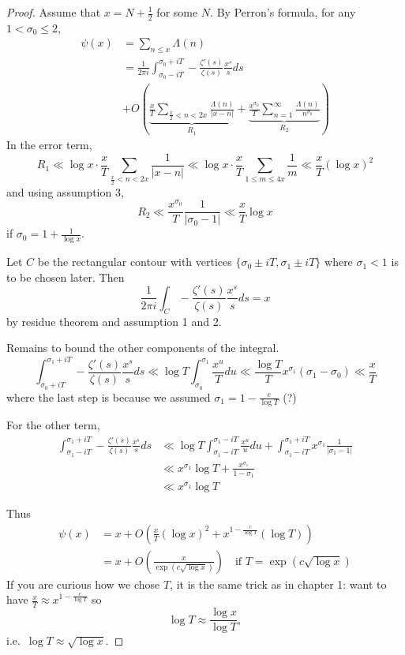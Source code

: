 \documentclass[a4paper]{article}
\theoremstyle{definition}
\begin{document}
\begin{proof}
  Assume that \(x = N + \frac{1}{2}\) for some \(N\). By Perron's formula, for any \(1 < \sigma_0 \leq 2\),
  \begin{align*}
    \psi(x)
    &= \sum_{n \leq x} \Lambda(n) \\
    &= \frac{1}{2\pi i} \int_{\sigma_0 - iT}^{\sigma_0 + iT} - \frac{\zeta'(s)}{\zeta(s)} \frac{x^s}{s} ds \\
    &+ O(\underbrace{\frac{x}{T} \sum_{\frac{x}{2} < n < 2x} \frac{\Lambda(n)}{|x - n|}}_{R_1} + \underbrace{\frac{x^{\sigma_0}}{T} \sum_{n = 1}^\infty \frac{\Lambda(n)}{n^{\sigma_0}}}_{R_2})
  \end{align*}
  In the error term,
  \[
    R_1
    \ll \log x \cdot \frac{x}{T} \sum_{\frac{x}{2} < n < 2x} \frac{1}{|x - n|}
    \ll \log x \cdot \frac{x}{T} \sum_{1 \leq m \leq 4x} \frac{1}{m}
    \ll \frac{x}{T} (\log x)^2
  \]
  and using assumption 3,
  \[
    R_2
    \ll \frac{x^{\sigma_0}}{T} \frac{1}{|\sigma_0 - 1|}
    \ll \frac{x}{T} \log x
  \]
  if \(\sigma_0 = 1 + \frac{1}{\log x}\).

  Let \(C\) be the rectangular contour with vertices \(\{\sigma_0 \pm iT, \sigma_1 \pm iT\}\) where \(\sigma_1 < 1\) is to be chosen later. Then
  \[
    \frac{1}{2\pi i} \int_C - \frac{\zeta'(s)}{\zeta(s)} \frac{x^s}{s} ds = x
  \]
  by residue theorem and assumption 1 and 2.

  Remains to bound the other components of the integral.
  \[
    \int_{\sigma_0 + iT}^{\sigma_1 + iT} - \frac{\zeta'(s)}{\zeta(s)} \frac{x^s}{s} ds
    \ll \log T \int_{\sigma_0}^{\sigma_1} \frac{x^u}{T} du
    \ll \frac{\log T}{T} x^{\sigma_1} (\sigma_1 - \sigma_0) \ll \frac{x}{T}
  \]
  where the last step is because we assumed \(\sigma_1 = 1 - \frac{c}{\log T}\) (?)

  For the other term,
  \begin{align*}
    \int_{\sigma_1 - iT}^{\sigma_1 + iT} - \frac{\zeta'(s)}{\zeta(s)} \frac{x^s}{s} ds
    &\ll \log T \int_{\sigma_1 - iT}^{\sigma_1 - iT} \frac{x^u}{u} du + \int_{\sigma_1 - iT}^{\sigma_1 + iT} x^{\sigma_1} \frac{1}{|\sigma_1 - 1|} \\
    &\ll x^{\sigma_1} \log T + \frac{x^{\sigma_1}}{1 - \sigma_1} \\
    &\ll x^{\sigma_1} \log T
  \end{align*}

  Thus
  \begin{align*}
    \psi(x)
    &= x + O(\frac{x}{T} (\log x)^2 + x^{1 - \frac{c}{\log T}} (\log T)) \\
    &= x + O(\frac{x}{\exp(c \sqrt{\log x})}) \quad \text{if } T = \exp(c \sqrt{\log x})
  \end{align*}
  If you are curious how we chose \(T\), it is the same trick as in chapter 1: want to have \(\frac{x}{T} \approx x^{1 - \frac{c}{\log T}}\) so
    \[
      \log T \approx \frac{\log x}{\log T},
    \]
    i.e.\ \(\log T \approx \sqrt{\log x}\).
\end{proof}












\printindex
\end{document}
